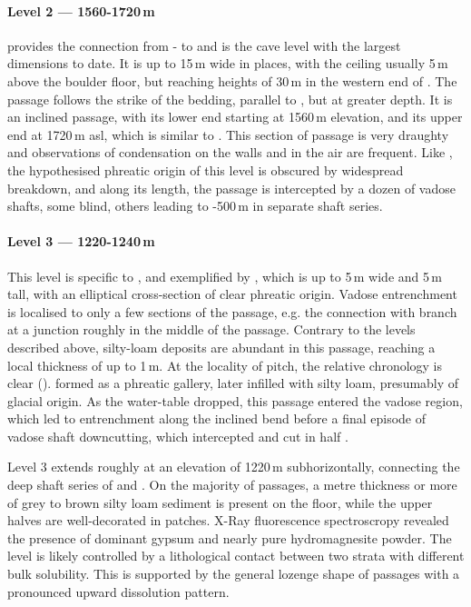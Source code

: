\paragraph{Level 2 — 1560-1720\,m}

 provides the connection from - to  and is the cave level with the largest dimensions to date. 
It is up to 15\,m wide in places, with the ceiling usually 5\,m above the boulder floor, but reaching heights of 30\,m in the western end of . 
The passage follows the strike of the bedding, parallel to , but at greater depth. 
It is an inclined passage, with its lower end starting at 1560\,m elevation, and its upper end  at 1720\,m asl, which is similar to . 
This section of passage is very draughty and observations of condensation on the walls and in the air are frequent. 
Like , the hypothesised phreatic origin of this level is obscured by widespread breakdown, and along its length, the passage is intercepted by a dozen of vadose shafts, some blind, others leading to -500\,m in separate shaft series. 

\paragraph{Level 3 — 1220-1240\,m}
This level is specific to , and exemplified by , which is up to 5\,m wide and 5\,m tall, with an elliptical cross-section of clear phreatic origin. Vadose entrenchment is localised to only a few sections of the passage, e.g. the connection with  branch at a junction roughly in the middle of the passage. 
Contrary to the levels described above, silty-loam deposits are abundant in this passage, reaching a local thickness of up to 1\,m. 
At the locality of  pitch, the relative chronology is clear (). 
 formed as a phreatic gallery, later infilled with silty loam, presumably of glacial origin. 
As the water-table dropped, this passage entered the vadose region, which led to entrenchment along the inclined bend before a final episode of vadose shaft downcutting, which intercepted and cut in half .

Level 3 extends roughly at an elevation of 1220\,m subhorizontally, connecting the deep shaft series of  and . 
On the majority of passages, a metre thickness or more of grey to brown silty loam sediment is present on the floor, while the upper halves are well-decorated in patches.
X-Ray fluorescence spectroscropy revealed the presence of dominant gypsum and nearly pure hydromagnesite powder.
The level is likely controlled by a lithological contact between two strata with different bulk solubility. 
This is supported by the general lozenge shape of passages with a pronounced upward dissolution pattern. 

